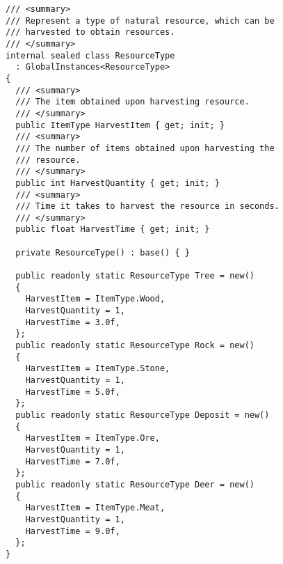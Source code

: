 \begin{verbatim}
/// <summary>
/// Represent a type of natural resource, which can be
/// harvested to obtain resources.
/// </summary>
internal sealed class ResourceType 
  : GlobalInstances<ResourceType>
{
  /// <summary>
  /// The item obtained upon harvesting resource.
  /// </summary>
  public ItemType HarvestItem { get; init; }
  /// <summary>
  /// The number of items obtained upon harvesting the
  /// resource.
  /// </summary>
  public int HarvestQuantity { get; init; }
  /// <summary>
  /// Time it takes to harvest the resource in seconds.
  /// </summary>
  public float HarvestTime { get; init; }

  private ResourceType() : base() { }
  
  public readonly static ResourceType Tree = new()
  {
    HarvestItem = ItemType.Wood,
    HarvestQuantity = 1,
    HarvestTime = 3.0f,
  };
  public readonly static ResourceType Rock = new()
  {
    HarvestItem = ItemType.Stone,
    HarvestQuantity = 1,
    HarvestTime = 5.0f,
  };
  public readonly static ResourceType Deposit = new()
  {
    HarvestItem = ItemType.Ore,
    HarvestQuantity = 1,
    HarvestTime = 7.0f,
  };
  public readonly static ResourceType Deer = new()
  {
    HarvestItem = ItemType.Meat,
    HarvestQuantity = 1,
    HarvestTime = 9.0f,
  };
}
\end{verbatim}












